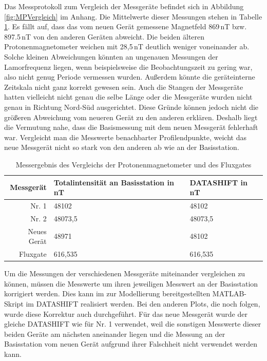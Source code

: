 Das Messprotokoll zum Vergleich der Messgeräte befindet sich in Abbildung \ref{fig:MPVergleich} im Anhang. Die Mittelwerte dieser Messungen stehen in Tabelle \ref{tab:VergleichErgebnis}. Es fällt auf, dass das vom neuen Gerät gemessene Magnetfeld 869\,nT bzw. 897.5\,nT von den anderen Geräten abweicht. Die beiden älteren Protonenmagnetometer weichen mit 28,5\,nT deutlich weniger voneinander ab. Solche kleinen Abweichungen könnten an ungenauen Messungen der Lamorfrequenz liegen, wenn beispielsweise die Beobachtungszeit zu gering war, also nicht genug Periode vermessen wurden. Außerdem könnte die geräteinterne Zeitskala nicht ganz korrekt gewesen sein. Auch die Stangen der Messgeräte hatten vielleicht nicht genau die selbe Länge oder die Messgeräte wurden nicht genau in Richtung Nord-Süd ausgerichtet. Diese Gründe können jedoch nicht die größeren Abweichung vom neueren Gerät zu den anderen erklären. Deshalb liegt die Vermutung nahe, dass die Basismessung  mit dem neuen Messgerät fehlerhaft war. Vergleicht man die Messwerte benachbarter Profilendpunkte, weicht das neue Messgerät nicht so stark von den anderen ab wie an der Basisstation.

\begin{table}[!ht]
 \centering
 \caption{Messergebnis des Vergleichs der Protonenmagnetometer und des Fluxgates}
 \begin{tabular}{rll}
 \toprule
 Messgerät & Totalintensität an Basisstation in nT & DATASHIFT in nT \\
 \midrule
 Nr. 1 & 48102 &48102\\
 Nr. 2 & 48073,5 & 48073,5\\
 Neues Gerät & 48971 & 48102\\
 Fluxgate & 616,535 & 616,535\\
 \bottomrule
 \end{tabular}
\label{tab:VergleichErgebnis}
\end{table}

Um die Messungen der verschiedenen Messgeräte miteinander vergleichen zu können, müssen die Messwerte um ihren jeweiligen Messwert an der Basisstation korrigiert werden. Dies kann im zur Modellierung bereitgestellten MATLAB-Skript im DATASHIFT realisiert werden. Bei den anderen Plots, die noch folgen, wurde diese Korrektur auch durchgeführt. Für das neue Messgerät wurde der gleiche DATASHIFT wie für Nr. 1 verwendet, weil die sonstigen Messwerte dieser beiden Geräte am nächsten aneinander liegen und die Messung an der Basisstation vom neuen Gerät aufgrund ihrer Falschheit nicht verwendet werden kann.

